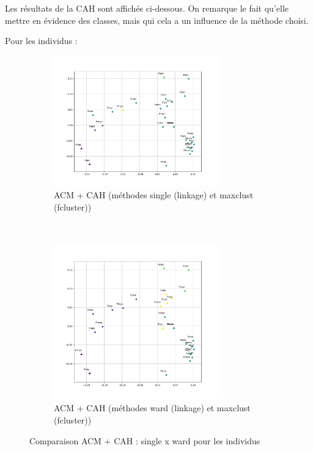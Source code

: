 Les résultats de la CAH sont affichés ci-dessous. On remarque le fait qu'elle mettre en évidence des classes, mais qui cela a un influence de la méthode choisi.
    
Pour les individus :
    
    \begin{figure}[!htb]
        \begin{subfigure}[b]{1.0\textwidth}
            \centering
            \includegraphics[width=0.78\textwidth]{img/mixte_acm_cah/ACM-Projection_des_individus_cah_'single'_'maxclust'.jpg}
            \caption{ACM + CAH (méthodes single (linkage) et maxclust (fcluster))}
            \label{Label_ACM-Projection_des_individus_cah_'single'_'maxclust'.jpg}
        \end{subfigure}
        \\
        \begin{subfigure}[b]{1.0\textwidth}
            \centering
            \includegraphics[width=0.78\textwidth]{img/mixte_acm_cah/ACM-Projection_des_individus_cah_'ward'_'maxclust'.jpg}
            \caption{ACM + CAH (méthodes ward (linkage) et maxclust (fcluster))}
            \label{ACM-Projection_des_individus_cah_'ward'_'maxclust'.jpg}
        \end{subfigure}
        \caption{Comparaison ACM + CAH : single x ward pour les individus}
    \end{figure}
    
